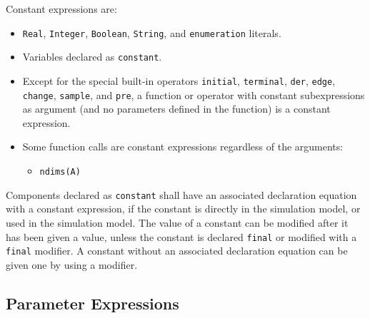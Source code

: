 Constant expressions are:
\begin{itemize}
\item
  \lstinline!Real!, \lstinline!Integer!, \lstinline!Boolean!, \lstinline!String!, and \lstinline!enumeration! literals.
\item
  Variables declared as \lstinline!constant!.
\item
  Except for the special built-in operators \lstinline!initial!, \lstinline!terminal!, \lstinline!der!,
  \lstinline!edge!, \lstinline!change!, \lstinline!sample!, and \lstinline!pre!, a function or operator with constant
  subexpressions as argument (and no parameters defined in the function)
  is a constant expression.
\item
  Some function calls are constant expressions regardless of the arguments:
  \begin{itemize}
  \item
    \lstinline!ndims(A)!
  \end{itemize}
\end{itemize}

Components declared as \lstinline!constant! shall have an associated declaration equation with a constant expression, if the constant is directly in the simulation model, or used in the simulation model.  The value of a constant can be modified after it has been given a value, unless the constant is declared \lstinline!final! or modified with a \lstinline!final! modifier.  A constant without an associated declaration equation can be given one by using a modifier.

\subsection{Parameter Expressions}\label{parameter-expressions}

